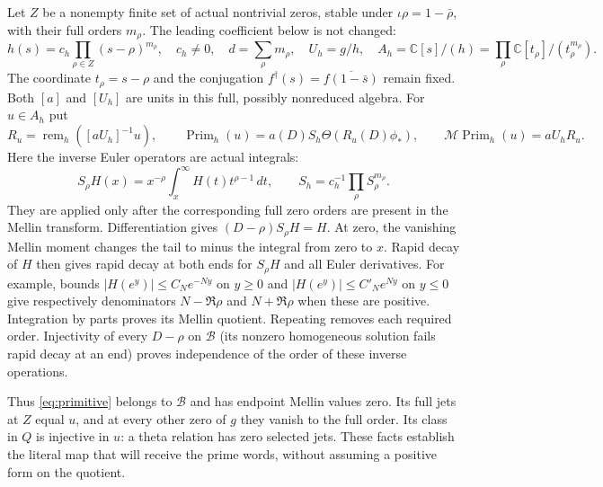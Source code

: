 \documentclass[11pt]{article}
\DeclareMathOperator{\rem}{rem}
\newcommand{\C}{\mathbb C}
\newcommand{\B}{\mathscr B}
\newcommand{\MM}{\mathcal M}
\newcommand{\PP}{\operatorname{Prim}_h}
\newcommand{\dd}{\,d}
\begin{document}
Let $Z$ be a nonempty finite set of actual nontrivial zeros, stable under
$\iota\rho=1-\bar\rho$, with their full orders $m_\rho$.
The leading coefficient below is not changed:
\begin{equation}
 h(s)=c_h\prod_{\rho\in Z}(s-\rho)^{m_\rho},\quad c_h\ne0,
 \quad d=\sum_\rho m_\rho,\quad U_h=g/h,\quad
 A_h=\C[s]/(h)=\prod_\rho\C[t_\rho]/(t_\rho^{m_\rho}).\label{eq:packet}
\end{equation}
The coordinate $t_\rho=s-\rho$ and the conjugation
$f^\dagger(s)=\overline{f(1-\bar s)}$ remain fixed.
Both $[a]$ and $[U_h]$ are units in this full, possibly nonreduced algebra.
For $u\in A_h$ put
\begin{equation}
 R_u=\rem_h([aU_h]^{-1}u),\qquad
 \PP(u)=a(D)S_h\Theta(R_u(D)\phi_*),\qquad
 \MM\PP(u)=aU_hR_u.\label{eq:primitive}
\end{equation}
Here the inverse Euler operators are actual integrals:
\begin{equation}
 S_\rho H(x)=x^{-\rho}\int_x^\infty H(t)t^{\rho-1}\dd t,
 \qquad S_h=c_h^{-1}\prod_\rho S_\rho^{m_\rho}.\label{eq:inverse}
\end{equation}
They are applied only after the corresponding full zero orders are
present in the Mellin transform. Differentiation gives
$(D-\rho)S_\rho H=H$. At zero, the vanishing Mellin moment changes
the tail to minus the integral from zero to $x$. Rapid decay of $H$
then gives rapid decay at both ends for $S_\rho H$ and all Euler
derivatives. For example, bounds $|H(e^y)|\le C_Ne^{-Ny}$ on $y\ge0$
and $|H(e^y)|\le C'_Ne^{Ny}$ on $y\le0$ give respectively denominators
$N-\Re\rho$ and $N+\Re\rho$ when these are positive.
Integration by parts proves its Mellin quotient. Repeating removes
each required order. Injectivity of every $D-\rho$ on $\B$ (its
nonzero homogeneous solution fails rapid decay at an end) proves
independence of the order of these inverse operations.

Thus \eqref{eq:primitive} belongs to $\B$ and has endpoint Mellin values
zero. Its full jets at $Z$ equal $u$, and at every other zero of $g$
they vanish to the full order. Its class in $Q$ is injective in $u$:
a theta relation has zero selected jets. These facts establish the
literal map that will receive the prime words, without assuming a
positive form on the quotient.


\end{document}
